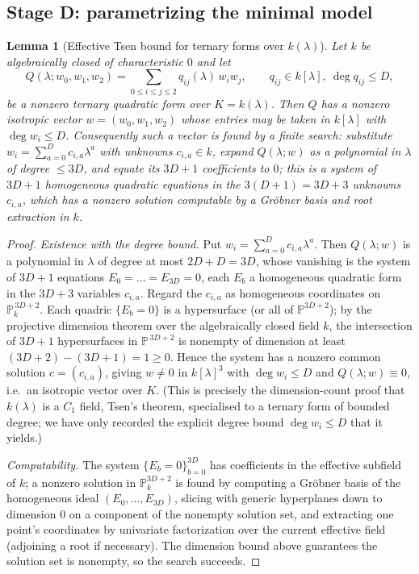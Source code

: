 \documentclass{amsart}
\theoremstyle{plain}
\newtheorem{lemma}{Lemma}
\theoremstyle{definition}
\newcommand{\PP}{\mathbb{P}}
\begin{document}
\subsection{Stage D: parametrizing the minimal model}

\begin{lemma}[Effective Tsen bound for ternary forms over $k(\lambda)$]
\label{lem:tsen}
Let $k$ be algebraically closed of characteristic $0$ and let
\[
Q(\lambda;w_0,w_1,w_2)=\sum_{0\le i\le j\le 2} q_{ij}(\lambda)\,w_iw_j ,
\qquad q_{ij}\in k[\lambda],\ \deg q_{ij}\le D,
\]
be a nonzero ternary quadratic form over $K=k(\lambda)$.  Then $Q$ has a nonzero
isotropic vector $w=(w_0,w_1,w_2)$ whose entries may be taken in $k[\lambda]$
with $\deg w_i\le D$.  Consequently such a vector is found by a finite search:
substitute $w_i=\sum_{a=0}^{D}c_{i,a}\lambda^a$ with unknowns $c_{i,a}\in k$,
expand $Q(\lambda;w)$ as a polynomial in $\lambda$ of degree $\le 3D$, and equate
its $3D+1$ coefficients to $0$; this is a system of $3D+1$ homogeneous quadratic
equations in the $3(D+1)=3D+3$ unknowns $c_{i,a}$, which has a nonzero solution
computable by a Gr\"obner basis and root extraction in $k$.
\end{lemma}

\begin{proof}
\emph{Existence with the degree bound.}  Put $w_i=\sum_{a=0}^{D}c_{i,a}\lambda^a$.
Then $Q(\lambda;w)$ is a polynomial in $\lambda$ of degree at most $2D+D=3D$,
whose vanishing is the system of $3D+1$ equations $E_0=\dots=E_{3D}=0$, each
$E_b$ a homogeneous quadratic form in the $3D+3$ variables $c_{i,a}$.  Regard the
$c_{i,a}$ as homogeneous coordinates on $\PP^{\,3D+2}_k$.  Each quadric
$\{E_b=0\}$ is a hypersurface (or all of $\PP^{3D+2}$); by the projective
dimension theorem over the algebraically closed field $k$, the intersection of
$3D+1$ hypersurfaces in $\PP^{\,3D+2}$ is nonempty of dimension at least
$(3D+2)-(3D+1)=1\ge 0$.  Hence the system has a nonzero common solution
$c=(c_{i,a})$, giving $w\ne 0$ in $k[\lambda]^3$ with $\deg w_i\le D$ and
$Q(\lambda;w)\equiv 0$, i.e.\ an isotropic vector over $K$.  (This is precisely
the dimension-count proof that $k(\lambda)$ is a $C_1$ field, Tsen's theorem,
specialised to a ternary form of bounded degree; we have only recorded the
explicit degree bound $\deg w_i\le D$ that it yields.)

\emph{Computability.}  The system $\{E_b=0\}_{b=0}^{3D}$ has coefficients in the
effective subfield of $k$; a nonzero solution in $\PP^{3D+2}_k$ is found by
computing a Gr\"obner basis of the homogeneous ideal $(E_0,\dots,E_{3D})$,
slicing with generic hyperplanes down to dimension $0$ on a component of the
nonempty solution set, and extracting one point's coordinates by univariate
factorization over the current effective field (adjoining a root if necessary).
The dimension bound above guarantees the solution set is nonempty, so the search
succeeds.
\end{proof}
\end{document}
